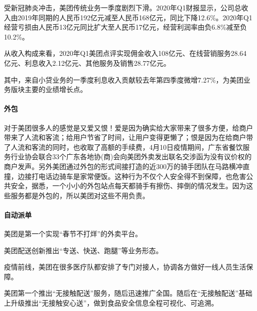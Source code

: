 \documentclass[letterpaper,10pt,english]{sphinxmanual}
\begin{document}
受新冠肺炎冲击，美团传统业务一季度剧烈下滑。2020年Q1财报显示，公司总收入由2019年同期的人民币192亿元减至人民币168亿元，同比下降12.6\%。2020年Q1经营亏损由人民币13亿元同比扩大至人民币17亿元，经营利润率由负6.8\%减至负10.2\%。

从收入构成来看，2020年Q1美团点评实现佣金收入108亿元、在线营销服务28.64亿元、利息收入2.12亿元、其他服务及销售28.77亿元。

其中，来自小贷业务的一季度利息收入贡献较去年第四季度微增7.27\%，为美团业务版块主要的业绩增长点。%
\begin{footnote}[1049]\sphinxAtStartFootnote
{}
%
\end{footnote}


\paragraph{外包}
\label{\detokenize{chapter_AI_company/meituan:id21}}
对于美团很多人的感觉是又爱又恨！爱是因为确实给大家带来了很多方便，给商户带来了人流和客流；给用户节省了时间，让用户变得更懒了；恨是因为在给商户带了人流和客流的同时，也收取了高额的手续费，4月10日疫情期间，广东省餐饮服务行业协会联合33个广东各地协(商)会向美团外卖发出联名交涉函为没有议价权的商户发声。另外美团通过外包的形式间接打造的近300万的骑手团队在马路横冲直撞，边接打电话边骑车是家常便饭。这种行为不仅个人安全得不到保障，也危害公共安全，据悉，一个小小的外包站点每天都骑手有擦伤、摔倒的情况发生。因为这些服务都是外包的，所以美团对这些不用负责。%
\begin{footnote}[1050]\sphinxAtStartFootnote
{}
%
\end{footnote}


\paragraph{自动派单}
\label{\detokenize{chapter_AI_company/meituan:id22}}
美团是第一个实现“春节不打烊”的外卖平台。

美团配送创新推出“专送、快送、跑腿”等业务形态。

疫情前线，美团在很多医疗队都安排了专门对接人，协调各方做好一线人员生活保障。

美团第一个推出“无接触配送”服务，随后迅速推广全国。随后在“无接触配送”基础上升级推出“无接触安心送”，做到食品安全信息全程可视化、可追溯。
\end{document}
